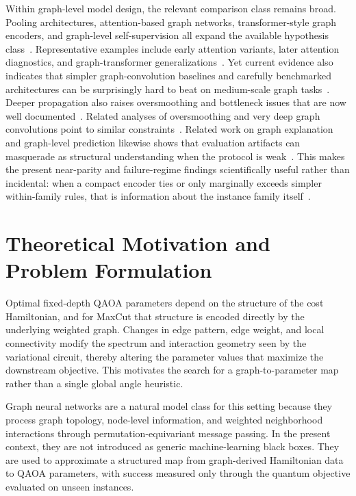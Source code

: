 \documentclass[
  reprint,
  twocolumn,
  aps,
  superscriptaddress,
  longbibliography,
  floatfix
]{revtex4-2}
\begin{document}
Within graph-level model design, the relevant comparison class remains broad. Pooling architectures, attention-based graph networks, transformer-style graph encoders, and graph-level self-supervision all expand the available hypothesis class~\cite{ying2018diffpool,gao2019,sun2020infograph}. Representative examples include early attention variants, later attention diagnostics, and graph-transformer generalizations~\cite{thekumparampil2018,brody2022,dwivedi2021bresson}. Yet current evidence also indicates that simpler graph-convolution baselines and carefully benchmarked architectures can be surprisingly hard to beat on medium-scale graph tasks~\cite{lee2019sagpool,ying2021transformer}. Deeper propagation also raises oversmoothing and bottleneck issues that are now well documented~\cite{zhao2020,alon2021,topping2022}. Related analyses of oversmoothing and very deep graph convolutions point to similar constraints~\cite{cai2020,li2019deepgcn}. Related work on graph explanation and graph-level prediction likewise shows that evaluation artifacts can masquerade as structural understanding when the protocol is weak~\cite{ying2019explainer,zhang2018link}. This makes the present near-parity and failure-regime findings scientifically useful rather than incidental: when a compact encoder ties or only marginally exceeds simpler within-family rules, that is information about the instance family itself~\cite{chen2022nodeformer,you2020gcl}.

\section{Theoretical Motivation and Problem Formulation}
Optimal fixed-depth QAOA parameters depend on the structure of the cost Hamiltonian, and for MaxCut that structure is encoded directly by the underlying weighted graph. Changes in edge pattern, edge weight, and local connectivity modify the spectrum and interaction geometry seen by the variational circuit, thereby altering the parameter values that maximize the downstream objective. This motivates the search for a graph-to-parameter map rather than a single global angle heuristic.

Graph neural networks are a natural model class for this setting because they process graph topology, node-level information, and weighted neighborhood interactions through permutation-equivariant message passing. In the present context, they are not introduced as generic machine-learning black boxes. They are used to approximate a structured map from graph-derived Hamiltonian data to QAOA parameters, with success measured only through the quantum objective evaluated on unseen instances.
\end{document}

